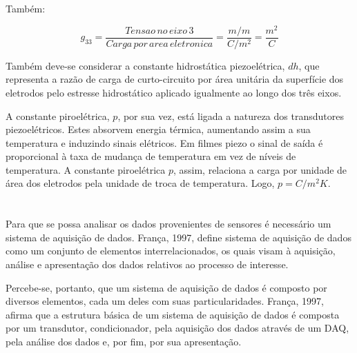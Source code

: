 \documentclass[
	12pt,				
	oneside,			
	a4paper,			
	english,			
	brazil,			
	]{abntex2ppgsi}
\begin{document}
Também:

\begin{equation}
	g_{33} = \frac{Tensao \,no \,eixo \,3}{Carga \,por \,area \,eletronica} = \frac{m/m}{C/m^{2}} = \frac{m^{2}}{C}
	\label{eq: Contante G, expressando a tensão ao longo de um eixo específico pela carga elétrica por área unitária de eletrodos.}
\end{equation}

Também deve-se considerar a constante hidrostática piezoelétrica, $dh$, que representa a razão de carga de curto-circuito por área unitária da superfície dos eletrodos pelo estresse hidrostático aplicado igualmente ao longo dos três eixos. 

A constante piroelétrica, $p$, por sua vez, está ligada a natureza dos transdutores piezoelétricos. Estes absorvem energia térmica, aumentando assim a sua temperatura e induzindo sinais elétricos. Em filmes piezo o sinal de saída é proporcional à taxa de mudança de temperatura em vez de níveis de temperatura. A constante piroelétrica $p$, assim, relaciona a carga por unidade de área dos eletrodos pela unidade de troca de temperatura. Logo, $p = C/m^{2} K$.

\newpage
\section{}

Para que se possa analisar os dados provenientes de sensores é necessário um sistema de aquisição de dados. França, 1997, define sistema de aquisição de dados como um conjunto de elementos interrelacionados, os quais visam à aquisição, análise e apresentação dos dados relativos ao processo de interesse.

Percebe-se, portanto, que um sistema de aquisição de dados é composto por diversos elementos, cada um deles com suas particularidades. França, 1997, afirma que a estrutura básica de um sistema de aquisição de dados é composta por um transdutor, condicionador, pela aquisição dos dados através de um DAQ, pela análise dos dados e, por fim, por sua apresentação. 


\subsection{}
\label{sub:condicionamento}
\end{document}
